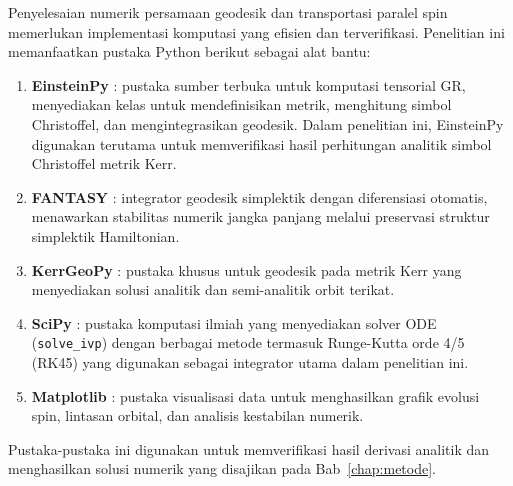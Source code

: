 Penyelesaian numerik persamaan geodesik dan transportasi paralel spin memerlukan implementasi komputasi yang efisien dan terverifikasi. Penelitian ini memanfaatkan pustaka Python berikut sebagai alat bantu:
\begin{enumerate}[label=(\roman*)]
    \item \textbf{EinsteinPy} \parencite{Bapat2020EinsteinPy}: pustaka sumber terbuka untuk komputasi tensorial GR, menyediakan kelas untuk mendefinisikan metrik, menghitung simbol Christoffel, dan mengintegrasikan geodesik. Dalam penelitian ini, EinsteinPy digunakan terutama untuk memverifikasi hasil perhitungan analitik simbol Christoffel metrik Kerr.
    \item \textbf{FANTASY} \parencite{Christian2020FANTASY}: integrator geodesik simplektik dengan diferensiasi otomatis, menawarkan stabilitas numerik jangka panjang melalui preservasi struktur simplektik Hamiltonian.
    \item \textbf{KerrGeoPy} \parencite{Park2024KerrGeoPy}: pustaka khusus untuk geodesik pada metrik Kerr yang menyediakan solusi analitik dan semi-analitik orbit terikat.
    \item \textbf{SciPy} \parencite{SciPy2020}: pustaka komputasi ilmiah yang menyediakan solver ODE (\texttt{solve\_ivp}) dengan berbagai metode termasuk Runge-Kutta orde 4/5 (RK45) yang digunakan sebagai integrator utama dalam penelitian ini.
    \item \textbf{Matplotlib} \parencite{Matplotlib2007}: pustaka visualisasi data untuk menghasilkan grafik evolusi spin, lintasan orbital, dan analisis kestabilan numerik.
\end{enumerate}

Pustaka-pustaka ini digunakan untuk memverifikasi hasil derivasi analitik dan menghasilkan solusi numerik yang disajikan pada Bab~\ref{chap:metode}.

